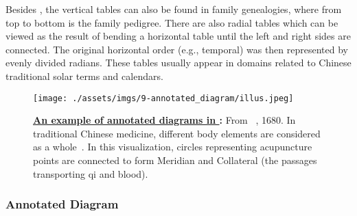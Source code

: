 Besides \term{\Shiji}, the vertical tables can also be found in family genealogies, where from top to bottom is the family pedigree.
There are also radial tables which can be viewed as the result of bending a horizontal table until the left and right sides are connected.
The original horizontal order (e.g., temporal) was then represented by evenly divided radians.
These tables usually appear in domains related to Chinese traditional solar terms and calendars.

\begin{figure}[!htb]
    \centering
    \texttt{[image: ./assets/imgs/9-annotated\_diagram/illus.jpeg]}
    \caption{
        \textbf{\href{https://tile.loc.gov/image-services/iiif/service:asian:lcnclscd:2012402918:1A007:01b02a/full/pct:100/0/default.jpg}{An example of annotated diagrams in \datasetName}:}
        From ~\cite{Yang1680Zhen}, 1680.
        In traditional Chinese medicine, different body elements are considered as a whole~\cite{Despeux2007Body}.
        In this visualization, circles representing acupuncture points are connected to form Meridian and Collateral (the passages transporting qi and blood).
    }
    \label{fig:illus-diagram}
\end{figure}

\subsubsection{Annotated Diagram}

